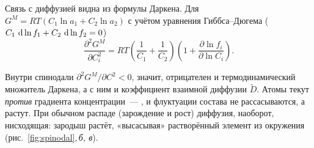 Связь с диффузией видна из формулы Даркена. Для $G^M=RT(C_1\ln a_1+C_2\ln a_2)$
с учётом уравнения Гиббса--Дюгема ($C_1\,\mathop{}\!\mathrm{d}\ln f_1+C_2\,\mathop{}\!\mathrm{d}\ln f_2=0$)
\begin{equation}\label{eq:spinodal}
\frac{\partial^2G^M}{\partial C_i^2}=RT\left(\frac1{C_1}+\frac1{C_2}\right)
\left(1+\frac{\partial\ln f_i}{\partial\ln C_i}\right).
\end{equation}
\begin{glavnoe}
Внутри спинодали $\partial^2G^M/\partial C^2<0$, значит, отрицателен и
термодинамический множитель Даркена, а с ним и коэффициент взаимной
диффузии $\widetilde D$. Атомы текут \emph{против} градиента концентрации~—
, и флуктуации состава не рассасываются, а
растут. При обычном распаде (зарождение и рост) диффузия, наоборот,
нисходящая: зародыш растёт, «высасывая» растворённый элемент из
окружения (рис.~\ref{fig:spinodal},\,\textit{б, в}).
\end{glavnoe}

